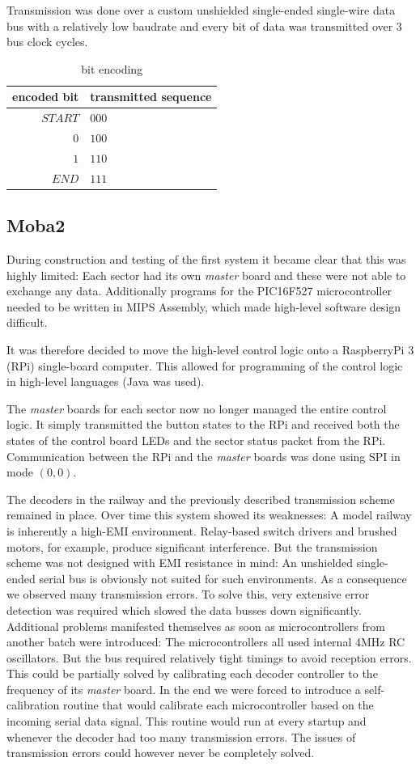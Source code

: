 \documentclass{scrreprt}
\begin{document}
Transmission was done over a custom unshielded single-ended single-wire data bus with a relatively low baudrate and every bit of data was transmitted over 3 bus clock cycles. 
\begin{table}[h!]
\centering
\begin{tabular}{ | r | l | }
\hline
encoded bit & transmitted sequence \\\hline\hline
$START$ & $000$ \\\hline
$0$     & $100$ \\\hline
$1$     & $110$ \\\hline
$END$   & $111$ \\\hline
\end{tabular}
\caption{bit encoding}
\end{table}

\subsection{Moba2}
During construction and testing of the first system it became clear that this was highly limited:
Each sector had its own \emph{master} board and these were not able to exchange any data.
Additionally programs for the PIC16F527 microcontroller needed to be written in MIPS Assembly, which made high-level software design difficult.

It was therefore decided to move the high-level control logic onto a RaspberryPi 3 (RPi) single-board computer.
This allowed for programming of the control logic in high-level languages (Java was used).

The \emph{master} boards for each sector now no longer managed the entire control logic.
It simply transmitted the button states to the RPi and received both the states of the control board LEDs and the sector status packet from the RPi.
Communication between the RPi and the \emph{master} boards was done using SPI in mode $(0,0)$.

The decoders in the railway and the previously described transmission scheme remained in place.
Over time this system showed its weaknesses:
A model railway is inherently a high-EMI environment.
Relay-based switch drivers and brushed motors, for example, produce significant interference.
But the transmission scheme was not designed with EMI resistance in mind:
An unshielded single-ended serial bus is obviously not suited for such environments.
As a consequence we observed many transmission errors.
To solve this, very extensive error detection was required which slowed the data busses down significantly.
Additional problems manifested themselves as soon as microcontrollers from another batch were introduced:
The microcontrollers all used internal 4MHz RC oscillators.
But the bus required relatively tight timings to avoid reception errors.
This could be partially solved by calibrating each decoder controller to the frequency of its \emph{master} board.
In the end we were forced to introduce a self-calibration routine that would calibrate each microcontroller based on the incoming serial data signal.
This routine would run at every startup and whenever the decoder had too many transmission errors.
The issues of transmission errors could however never be completely solved.
\end{document}
